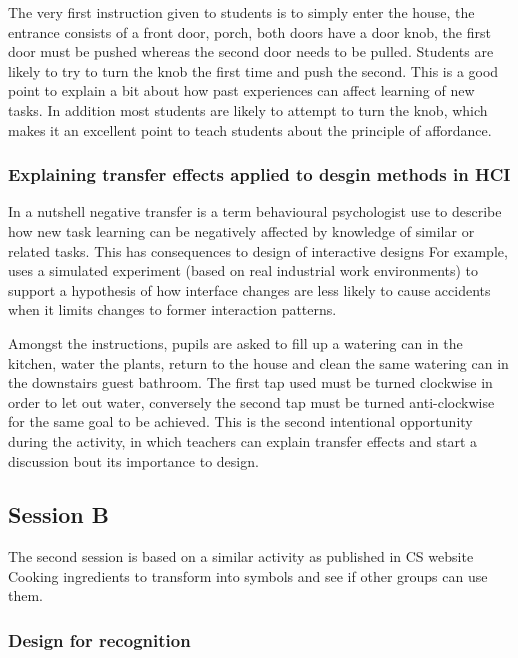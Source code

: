 \documentclass{sig-alternate}
\begin{document}
The very first instruction given to students is to simply enter the house, the entrance consists of a front door, porch, both doors have a door knob, the first door must be pushed whereas the second door needs to be pulled. Students are likely to try to turn the knob the first time and push the second. This is a good point to explain a bit about how past experiences can affect learning of new tasks. In addition most students are likely to attempt to turn the knob, which makes it an excellent point to teach students about the principle of affordance. 


\subsubsection*{Explaining transfer effects applied to desgin methods in HCI}
In a nutshell negative transfer\cite{Lunchin, Pan2010, Woltz} is a term behavioural psychologist use to describe how new task learning can be negatively affected by knowledge of similar or related tasks.
This has consequences to design of interactive designs \cite{waern1993varieties} For example,\cite{Besnard2005105} uses a simulated experiment (based on real industrial work environments) to support a hypothesis of how interface changes are less likely to cause accidents when it limits changes to former interaction patterns.

Amongst the instructions, pupils are asked to fill up a watering can in the kitchen, water the plants, return to the house and clean the same watering can in the downstairs guest bathroom. The first tap used must be turned clockwise in order to let out water, conversely the second tap must be turned anti-clockwise for the same goal to be achieved. This is the second intentional opportunity during the activity, in which teachers can explain transfer effects and start a discussion bout its importance to design.

\subsection{Session B}
The second session is based on a similar activity as published in {CS website}
Cooking ingredients to transform into symbols and see if other groups can use them.

\subsubsection*{Design for recognition}
 
\end{document}
